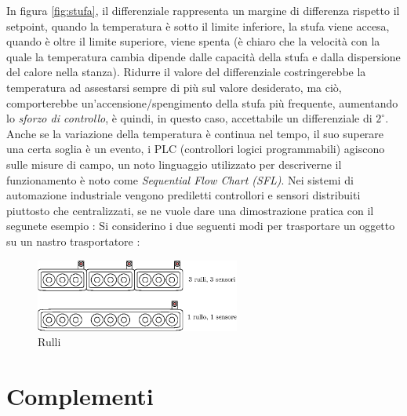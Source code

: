 \documentclass[10pt, letterpaper]{report}
\begin{document}
In figura \ref{fig:stufa}, il differenziale rappresenta un margine 
di differenza rispetto il setpoint, quando la temperatura è 
sotto il limite inferiore, la stufa viene accesa, quando è oltre il limite 
superiore, viene spenta (è chiaro che la velocità con la quale la temperatura 
cambia dipende dalle capacità della stufa e dalla dispersione del calore nella stanza).\acc 
Ridurre il valore del differenziale costringerebbe la temperatura ad assestarsi 
sempre di più sul valore desiderato, ma ciò, comporterebbe un'accensione/spengimento della 
stufa più frequente, aumentando lo \textit{sforzo di controllo}, è quindi, in questo 
caso, accettabile un differenziale di $2^\circ$.\acc 
Anche se la variazione della temperatura è continua nel tempo, il suo 
superare una certa soglia è un evento, i PLC (controllori logici programmabili) 
agiscono sulle misure di campo, un noto linguaggio utilizzato per descriverne 
il funzionamento è noto come \textit{Sequential Flow Chart (SFL)}.\acc 
Nei sistemi di automazione industriale vengono prediletti controllori e sensori distribuiti piuttosto 
che centralizzati, se ne vuole dare una dimostrazione pratica con il segunete 
esempio : Si considerino i due seguenti modi per trasportare un oggetto 
su un nastro trasportatore :\begin{center}
    \begin{figure}[h!]
        \centering
        \includegraphics[width=0.6\textwidth ]{images/rulli.eps}
        \caption{Rulli}
        \label{fig:rulli}
   \end{figure} 
\end{center}
















\chapter{Complementi}
\end{document}
